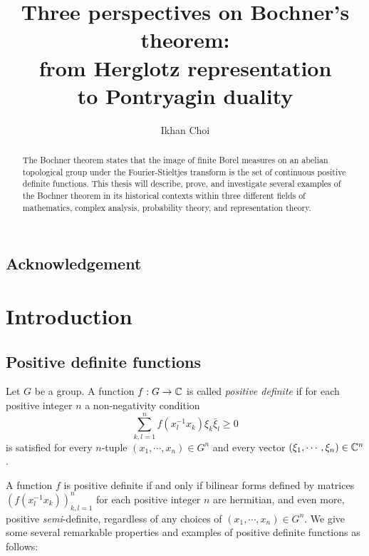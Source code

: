\documentclass[10pt]{article}
\title{Three perspectives on Bochner's theorem:\\from Herglotz representation\\to Pontryagin duality}
\author{Ikhan Choi}
\begin{document}
\maketitle
\begin{abstract}
The Bochner theorem states that the image of finite Borel measures on an abelian topological group under the Fourier-Stieltjes transform is the set of continuous positive definite functions.
This thesis will describe, prove, and investigate several examples of the Bochner theorem in its historical contexts within three different fields of mathematics, complex analysis, probability theory, and representation theory.
\end{abstract}
\tableofcontents

\subsection*{Acknowledgement}











\newpage
\section{Introduction}


\subsection{Positive definite functions}
\begin{defn}
Let $G$ be a group.
A function $f:G\to\mathbb{C}$ is called \emph{positive definite} if for each positive integer $n$ a non-negativity condition
\[\sum_{k,l=1}^nf(x_l^{-1}x_k)\xi_k\bar\xi_l\ge0\]
is satisfied for every $n$-tuple $(x_1,\cdots,x_n)\in G^n$ and every vector $(\xi_1,\cdots,\xi_n)\in\mathbb{C}^n$.
\end{defn}
A function $f$ is positive definite if and only if bilinear forms defined by matrices $(f(x_l^{-1}x_k))_{k,l=1}^n$ for each positive integer $n$ are hermitian, and even more, positive \emph{semi}-definite, regardless of any choices of $(x_1,\cdots,x_n)\in G^n$.
We give some several remarkable properties and examples of positive definite functions as follows:
\end{document}
